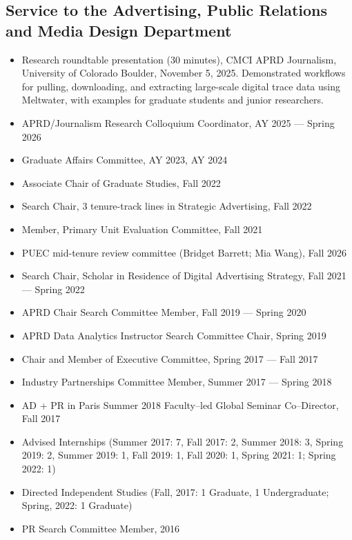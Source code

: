 \documentclass[11pt,letterpaper]{article}
\begin{document}
\subsection*{Service to the Advertising, Public Relations and Media Design Department}
\begin{itemize}
\item Research roundtable presentation (30 minutes), CMCI APRD Journalism, University of Colorado Boulder, November 5, 2025. Demonstrated workflows for pulling, downloading, and extracting large-scale digital trace data using Meltwater, with examples for graduate students and junior researchers.
\item APRD/Journalism Research Colloquium Coordinator, AY 2025 --- Spring 2026
\item Graduate Affairs Committee, AY 2023, AY 2024
\item Associate Chair of Graduate Studies, Fall 2022
\item Search Chair, 3 tenure-track lines in Strategic Advertising, Fall 2022
\item Member, Primary Unit Evaluation Committee, Fall 2021
\item PUEC mid-tenure review committee (Bridget Barrett; Mia Wang), Fall 2026
\item Search Chair, Scholar in Residence of Digital Advertising Strategy, Fall 2021 --- Spring 2022
\item APRD Chair Search Committee Member, Fall 2019 --- Spring 2020
\item APRD Data Analytics Instructor Search Committee Chair, Spring 2019
\item Chair and Member of Executive Committee, Spring 2017 --- Fall 2017
\item Industry Partnerships Committee Member, Summer 2017 --- Spring 2018
\item AD + PR in Paris Summer 2018 Faculty--led Global Seminar Co--Director, Fall 2017
\item Advised Internships (Summer 2017: 7, Fall 2017: 2, Summer 2018: 3, Spring 2019: 2, Summer 2019: 1, Fall 2019: 1, Fall 2020: 1, Spring 2021: 1; Spring 2022: 1)
\item Directed Independent Studies (Fall, 2017: 1 Graduate, 1 Undergraduate; Spring, 2022: 1 Graduate)
\item PR Search Committee Member, 2016
\end{itemize}
\end{document}
